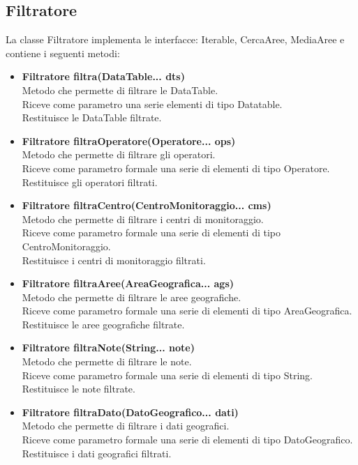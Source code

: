 \documentclass[a4paper, 12pt]{scrreprt}
\begin{document}
			\subsection{Filtratore}
			La classe Filtratore implementa le interfacce: Iterable, CercaAree, MediaAree e contiene i seguenti metodi:
			\begin{itemize}
				\item \textbf{Filtratore filtra(DataTable... dts)}
				\\Metodo che permette di filtrare le DataTable.
				\\Riceve come parametro una serie elementi di tipo Datatable.
				\\Restituisce le DataTable filtrate.
				
				\item \textbf{Filtratore filtraOperatore(Operatore... ops)}
				\\Metodo che permette di filtrare gli operatori.
				\\Riceve come parametro formale una serie di elementi di tipo Operatore.
				\\Restituisce gli operatori filtrati.
				
				\item \textbf{Filtratore filtraCentro(CentroMonitoraggio... cms)}
				\\Metodo che permette di filtrare i centri di monitoraggio.
				\\Riceve come parametro formale una serie di elementi di tipo CentroMonitoraggio.
				\\Restituisce i centri di monitoraggio filtrati.
				
				\item \textbf{Filtratore filtraAree(AreaGeografica... ags)}
				\\Metodo che permette di filtrare le aree geografiche.
				\\Riceve come parametro formale una serie di elementi di tipo AreaGeografica.
				\\Restituisce le aree geografiche filtrate.
				
				\item \textbf{Filtratore filtraNote(String... note)}
				\\Metodo che permette di filtrare le note.
				\\Riceve come parametro formale una serie di elementi di tipo String.
				\\Restituisce le note filtrate.
				
				\item \textbf {Filtratore filtraDato(DatoGeografico... dati)}
				\\Metodo che permette di filtrare i dati geografici.
				\\Riceve come parametro formale una serie di elementi di tipo DatoGeografico.
				\\Restituisce i dati geografici filtrati.
				

\end{itemize}
\end{document}
